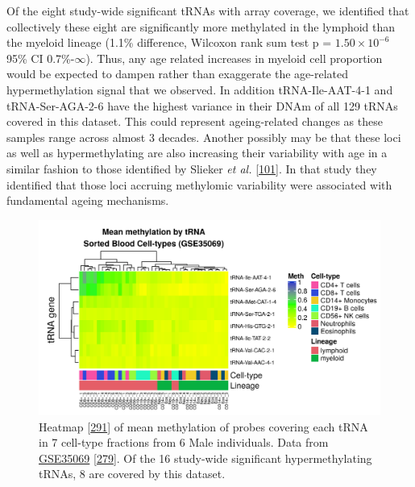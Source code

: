 \documentclass[
]{book}
\begin{document}
Of the eight study-wide significant tRNAs with array coverage, we identified that collectively these eight are significantly more methylated in the lymphoid than the myeloid lineage (1.1\% difference, Wilcoxon rank sum test p = \(1.50\times10^{-6}\) 95\% CI 0.7\%-\(\infty\)).
Thus, any age related increases in myeloid cell proportion would be expected to dampen rather than exaggerate the age-related hypermethylation signal that we observed.
In addition tRNA-Ile-AAT-4-1 and tRNA-Ser-AGA-2-6 have the highest variance in their DNAm of all 129 tRNAs covered in this dataset.
This could represent ageing-related changes as these samples range across almost 3 decades.
Another possibly may be that these loci as well as hypermethylating are also increasing their variability with age in a similar fashion to those identified by Slieker \emph{et al.} {[}\protect\hyperlink{ref-Slieker2016}{101}{]}.
In that study they identified that those loci accruing methylomic variability were associated with fundamental ageing mechanisms.

\begin{figure}

{\centering \includegraphics[width=1\linewidth]{./figs/meanMethbytRNAMatLowBB6_bl} 

}

\caption{Heatmap {[}\protect\hyperlink{ref-Gu2016}{291}{]} of mean methylation of probes covering each tRNA in 7 cell-type fractions from 6 Male individuals. Data from \href{https://www.ncbi.nlm.nih.gov/geo/query/acc.cgi?acc=GSE35069}{GSE35069} {[}\protect\hyperlink{ref-Reinius2012}{279}{]}. Of the 16 study-wide significant hypermethylating tRNAs, 8 are covered by this dataset.}\label{fig:meanMethbytRNAMatLowBB6}
\end{figure}
\end{document}

